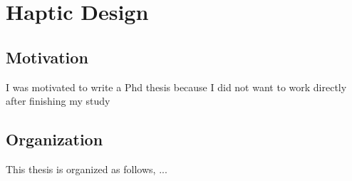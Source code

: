 \chapter{Haptic Design}
\section{Motivation}
I was motivated to write a Phd thesis because I did not want to work directly after finishing my study
\section{Organization}
This thesis is organized as follows, ...
